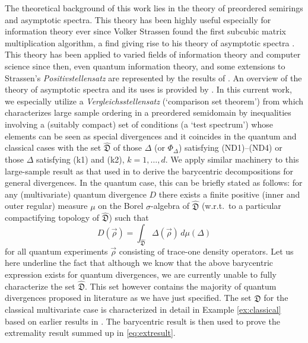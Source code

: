 \documentclass[12pt,a4paper,reqno]{amsart}
\theoremstyle{definition}
\newcommand{\mf}[1]{\mathfrak{#1}}
\begin{document}
The theoretical background of this work lies in the theory of preordered semirings and asymptotic spectra. This theory has been highly useful especially for information theory ever since Volker Strassen found the first subcubic matrix multiplication algorithm, a find giving rise to his theory of asymptotic spectra \cite{strassen1986,strassen1987,strassen1991,strassen1998}. This theory has been applied to varied fields of information theory and computer science since then, even quantum information theory, and some extensions to Strassen's {\it Positivstellensatz} are represented by the results of \cite{FritzI,FritzII,Vrana2022}. An overview of the theory of asymptotic spectra and its uses is provided by \cite{WigZuid}. In this current work, we especially utilize a {\it Vergleichsstellensatz} (`comparison set theorem') from \cite{FritzII} which characterizes large sample ordering in a preordered semidomain by inequalities involving a (suitably compact) set of conditions (a `test spectrum') whose elements can be seen as special divergences and it coincides in the quantum and classical cases with the set $\hat{\mf D}$ of those $\Delta$ (or $\Phi_\Delta$) satisfying (ND1)--(ND4) or those $\Delta$ satisfying (k1) and (k2), $k=1,\ldots,d$. We apply similar machinery to this large-sample result as that used in \cite{Mu_et_al_2021} to derive the barycentric decompositions for general divergences. In the quantum case, this can be briefly stated as follows: for any (multivariate) quantum divergence $D$ there exists a finite positive (inner and outer regular) measure $\mu$ on the Borel $\sigma$-algebra of $\hat{\mf D}$ (w.r.t.\ to a particular compactifying topology of $\hat{\mf D}$) such that
$$
D(\vec{\rho})=\int_{\hat{\mf D}}\Delta(\vec{\rho})\,d\mu(\Delta)
$$
for all quantum experiments $\vec{\rho}$ consisting of trace-one density operators. Let us here underline the fact that although we know that the above barycentric expression exists for quantum divergences, we are currently unable to fully characterize the set $\hat{\mf D}$. This set however contains the majority of quantum divergences proposed in literature as we have just specified. The set $\hat{\mf D}$ for the classical multivariate case is characterized in detail in Example \ref{ex:classical} based on earlier results in \cite{Farooq_et_al_2024}.
The barycentric result is then used to prove the extremality result summed up in \eqref{eq:extresult}.
\end{document}
